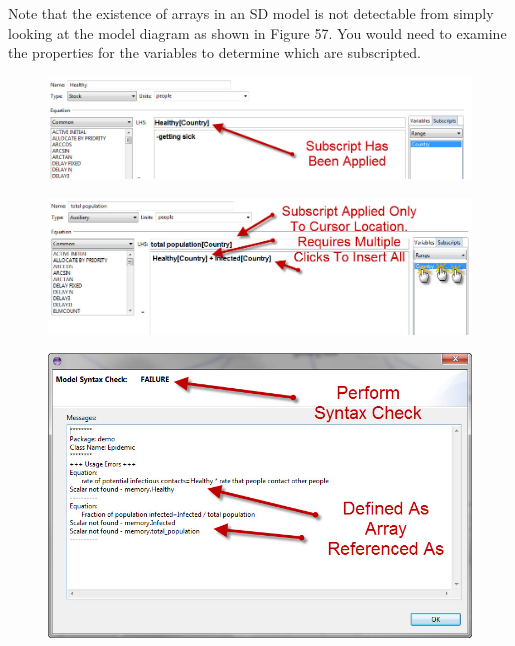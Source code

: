 \documentclass[11pt]{amsart}
\begin{document}
Note that the existence of arrays in an SD model is not detectable from simply looking at the model diagram as shown in Figure 57. You would need to examine the properties for the variables to determine which are subscripted.

\begin{figure}[ht]
\begin{center}
\vspace{.2in}
\centerline {
\includegraphics[totalheight=0.15\textheight]{images/057.jpg}
}
\caption{}
\label{fig:057}
\end{center}
\end{figure}




\begin{figure}[ht]
\begin{center}
\vspace{.2in}
\centerline {
\includegraphics[totalheight=0.15\textheight]{images/058.jpg}
}
\caption{}
\label{fig:058}
\end{center}
\end{figure}




\begin{figure}[ht]
\begin{center}
\vspace{.2in}
\centerline {
\includegraphics[totalheight=0.35\textheight]{images/059.jpg}
}
\caption{}
\label{fig:059}
\end{center}
\end{figure}
\end{document}
